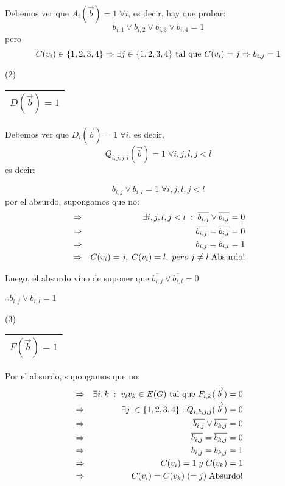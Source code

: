\documentclass[12pt,a4paper]{report}
\newcounter{neq}
\begin{document}
		Debemos ver que $A_{i}(\overrightarrow{b}) = 1 \; \forall i$, es decir, hay que probar:
		\[ b_{i, 1} \vee b_{i, 2} \vee b_{i, 3} \vee b_{i, 4} = 1 \]
		pero
		\[ C(v_{i}) \in \lbrace 1, 2, 3, 4 \rbrace \Rightarrow \exists j \in \lbrace 1, 2, 3, 4 \rbrace \textup{ tal que } C(v_{i}) = j \Rightarrow b_{i, j} = 1\]
		
		\vspace{3mm}
		(2) \begin{tabular}{|c|} \hline $D(\overrightarrow{b}) = 1$ \\ \hline \end{tabular}
		
		Debemos ver que $D_{i}(\overrightarrow{b}) = 1 \; \forall i$, es decir, 
		\[ Q_{i, j, j, l}(\overrightarrow{b}) = 1 \; \forall i, j, l,  j < l \] es decir:
		
		\[ \overline{b_{i, j}} \vee \overline{b_{i, l}} = 1 \; \forall i, j, l, j <  l\]
		por el absurdo, supongamos que no:
		\begin{eqnarray}
			\nonumber &\Rightarrow & \exists i, j, l, j < l \; : \; \overline{b_{i, j}} \vee \overline{b_{i, l}} = 0 \\
			\nonumber &\Rightarrow & \overline{b_{i, j}} = \overline{b_{i, l}} = 0 \\
			\nonumber &\Rightarrow & b_{i, j} = b_{i, l} = 1 \\
			\nonumber &\Rightarrow & C(v_{i}) = j, \; C(v_{i}) = l, \; pero \; j \neq l \; \textup{Absurdo!}
		\end{eqnarray}
		
		Luego, el absurdo vino de suponer que $\overline{b_{i, j}} \vee \overline{b_{i, l}} = 0$
		
		\vspace{3mm}
		$\therefore \overline{b_{i, j}} \vee \overline{b_{i, l}} = 1$
		
		\vspace{3mm}
		(3) \begin{tabular}{|c|} \hline $F(\overrightarrow{b}) = 1$ \\ \hline \end{tabular}
		\vspace{3mm}
		
		Por el absurdo, supongamos que no:
		\begin{eqnarray}
			\nonumber &\Rightarrow & \exists i, k \; : \; v_{i} v_{k} \in E(G) \textup{ tal que } F_{i, k}(\overrightarrow{b}) = 0 \\
			\nonumber &\Rightarrow & \exists j \; \in \lbrace 1, 2, 3, 4 \rbrace : Q_{i, k, j, j}(\overrightarrow{b}) = 0 \\
			\nonumber &\Rightarrow & \overline{b_{i, j}} \vee \overline{b_{k, j}} = 0 \\
			\nonumber &\Rightarrow & \overline{b_{i, j}} = \overline{b_{k, j}} = 0 \\
			\nonumber &\Rightarrow & b_{i, j} = b_{k, j} = 1 \\
			\nonumber &\Rightarrow & C(v_{i}) = 1\; y \; C(v_{k}) = 1\\
			\nonumber &\Rightarrow & C(v_{i}) = C(v_{k}) \; (= j) \; \textup{Absurdo!}
		\end{eqnarray}
		
\end{document}
